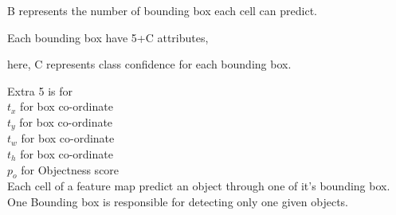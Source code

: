                     \tab \tab B represents the number of bounding box each cell can predict. 

                    \tab \tab Each bounding box have 5+C attributes,

                        \tab \tab \tab here, C represents class confidence for each bounding box.
                        
                        \tab \tab Extra 5 is for\\
                            \tab \tab \tab $t_x$ for box co-ordinate\\
                            \tab \tab \tab $t_y$ for box co-ordinate\\
                            \tab \tab \tab $t_w$ for box co-ordinate\\
                            \tab \tab \tab $t_h$ for box co-ordinate\\
                            \tab \tab \tab $p_o$ for Objectness score\\
                Each cell of a feature map predict an object through one of it's bounding box. One Bounding box is responsible for detecting only one given objects.
                
